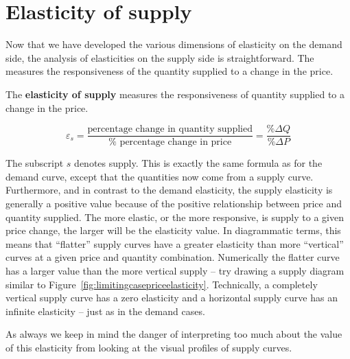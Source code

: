 \section{Elasticity of supply}\label{sec:ch4sec6}

Now that we have developed the various dimensions of elasticity on the
demand side, the analysis of elasticities on the supply side is
straightforward. The  measures the
responsiveness of the quantity supplied to a change in the price.

\begin{DefBox}
The \textbf{elasticity of supply} measures the responsiveness of quantity supplied to a change in the price.
\end{DefBox}

\begin{equation*}
\varepsilon_{s}=\frac{\text{percentage change in quantity supplied}}{\text{%
percentage change in price}}=\frac{\%\Delta Q}{\%\Delta P} 
\end{equation*}

The subscript $s$ denotes supply. This is exactly the same formula as for
the demand curve, except that the quantities now come from a supply curve.
Furthermore, and in contrast to the demand elasticity, the supply elasticity
is generally a positive value because of the positive relationship between
price and quantity supplied. The more elastic, or the more responsive, is
supply to a given price change, the larger will be the elasticity value. In
diagrammatic terms, this means that ``flatter'' supply curves have a greater
elasticity than more ``vertical'' curves at a given price and quantity
combination. Numerically the flatter curve has a larger value than the more
vertical supply -- try drawing a supply diagram similar to Figure~\ref{fig:limitingcasepriceelasticity}.
Technically, a completely vertical supply
curve has a zero elasticity and a horizontal supply curve has an infinite
elasticity -- just as in the demand cases.

As always we keep in mind the danger of interpreting too much about the
value of this elasticity from looking at the visual profiles of supply
curves.
